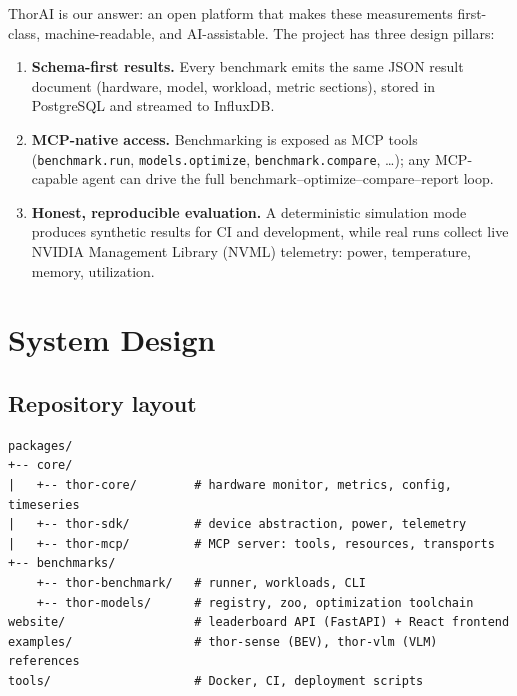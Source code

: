 \documentclass[11pt]{article}
\begin{document}
ThorAI is our answer: an open platform that makes these measurements
first-class, machine-readable, and AI-assistable. The project has
three design pillars:
\begin{enumerate}
  \item \textbf{Schema-first results.} Every benchmark emits the same
        JSON result document (hardware, model, workload, metric
        sections), stored in PostgreSQL and streamed to InfluxDB.
  \item \textbf{MCP-native access.} Benchmarking is exposed as MCP
        tools (\texttt{benchmark.run}, \texttt{models.optimize},
        \texttt{benchmark.compare}, \ldots); any MCP-capable agent can
        drive the full benchmark--optimize--compare--report loop.
  \item \textbf{Honest, reproducible evaluation.} A deterministic
        simulation mode produces synthetic results for CI and
        development, while real runs collect live NVIDIA Management
        Library (NVML) telemetry: power, temperature, memory,
        utilization.
\end{enumerate}

\section{System Design}
\label{sec:design}

\subsection{Repository layout}
\begin{verbatim}
packages/
+-- core/
|   +-- thor-core/        # hardware monitor, metrics, config, timeseries
|   +-- thor-sdk/         # device abstraction, power, telemetry
|   +-- thor-mcp/         # MCP server: tools, resources, transports
+-- benchmarks/
    +-- thor-benchmark/   # runner, workloads, CLI
    +-- thor-models/      # registry, zoo, optimization toolchain
website/                  # leaderboard API (FastAPI) + React frontend
examples/                 # thor-sense (BEV), thor-vlm (VLM) references
tools/                    # Docker, CI, deployment scripts
\end{verbatim}
\end{document}
